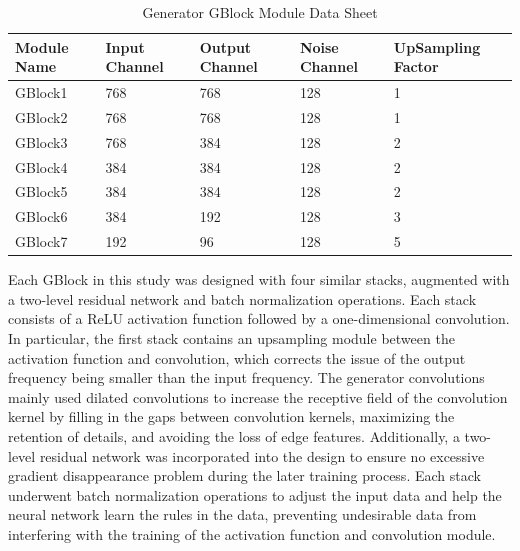 \documentclass[10pt,journal,compsoc]{IEEEtran}
\begin{document}
\begin{table}[ht]
\centering
\caption{Generator GBlock Module Data Sheet}
\label{tab:3-1}
\begin{tabularx}{0.5\textwidth}{|X|X|X|X|X|}
\hline
  Module Name & Input Channel & Output Channel & Noise Channel & UpSampling Factor \\
\hline
  GBlock1 & 768 & 768 & 128 & 1 \\
\hline
  GBlock2 & 768 & 768 & 128 & 1 \\
\hline
  GBlock3 & 768 & 384 & 128 & 2 \\
\hline
  GBlock4 & 384 & 384 & 128 & 2 \\
\hline
  GBlock5 & 384 & 384 & 128 & 2 \\
\hline
  GBlock6 & 384 & 192 & 128 & 3 \\
\hline
  GBlock7 & 192 & 96 & 128 & 5 \\
\hline
\end{tabularx}
\end{table}

Each GBlock in this study was designed with four similar stacks, augmented with a two-level residual network and batch normalization operations. Each stack consists of a ReLU activation function followed by a one-dimensional convolution. In particular, the first stack contains an upsampling module between the activation function and convolution, which corrects the issue of the output frequency being smaller than the input frequency. The generator convolutions mainly used dilated convolutions to increase the receptive field of the convolution kernel by filling in the gaps between convolution kernels, maximizing the retention of details, and avoiding the loss of edge features. Additionally, a two-level residual network was incorporated into the design to ensure no excessive gradient disappearance problem during the later training process. Each stack underwent batch normalization operations to adjust the input data and help the neural network learn the rules in the data, preventing undesirable data from interfering with the training of the activation function and convolution module.
\end{document}
